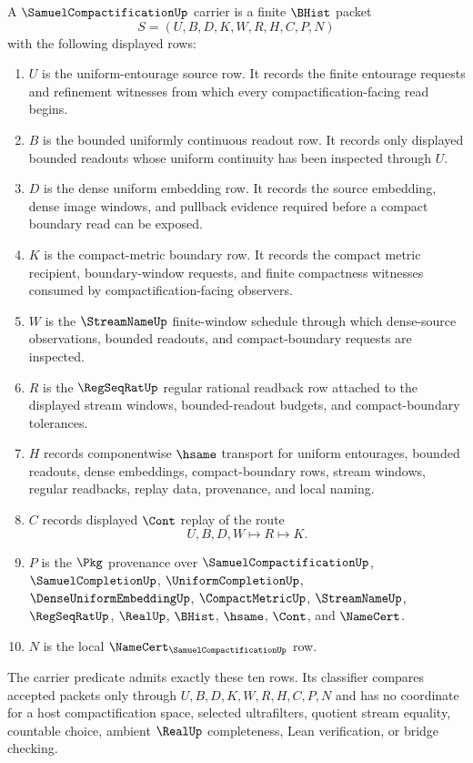 \begin{definition}
\label{def:samuel-compactification-carrier}
A $\SamuelCompactificationUp$ carrier is a finite $\BHist$ packet
$$
S=(U,B,D,K,W,R,H,C,P,N)
$$
with the following displayed rows:
\begin{enumerate}
\item $U$ is the uniform-entourage source row. It records the finite entourage requests and refinement witnesses from which every compactification-facing read begins.
\item $B$ is the bounded uniformly continuous readout row. It records only displayed bounded readouts whose uniform continuity has been inspected through $U$.
\item $D$ is the dense uniform embedding row. It records the source embedding, dense image windows, and pullback evidence required before a compact boundary read can be exposed.
\item $K$ is the compact-metric boundary row. It records the compact metric recipient, boundary-window requests, and finite compactness witnesses consumed by compactification-facing observers.
\item $W$ is the $\StreamNameUp$ finite-window schedule through which dense-source observations, bounded readouts, and compact-boundary requests are inspected.
\item $R$ is the $\RegSeqRatUp$ regular rational readback row attached to the displayed stream windows, bounded-readout budgets, and compact-boundary tolerances.
\item $H$ records componentwise $\hsame$ transport for uniform entourages, bounded readouts, dense embeddings, compact-boundary rows, stream windows, regular readbacks, replay data, provenance, and local naming.
\item $C$ records displayed $\Cont$ replay of the route
$$
U,B,D,W \longmapsto R \longmapsto K .
$$
\item $P$ is the $\Pkg$ provenance over $\SamuelCompactificationUp$, $\SamuelCompletionUp$, $\UniformCompletionUp$, $\DenseUniformEmbeddingUp$, $\CompactMetricUp$, $\StreamNameUp$, $\RegSeqRatUp$, $\RealUp$, $\BHist$, $\hsame$, $\Cont$, and $\NameCert$.
\item $N$ is the local $\NameCert_{\SamuelCompactificationUp}$ row.
\end{enumerate}
The carrier predicate admits exactly these ten rows. Its classifier compares accepted packets only through $U,B,D,K,W,R,H,C,P,N$ and has no coordinate for a host compactification space, selected ultrafilters, quotient stream equality, countable choice, ambient $\RealUp$ completeness, Lean verification, or bridge checking.
\end{definition}

